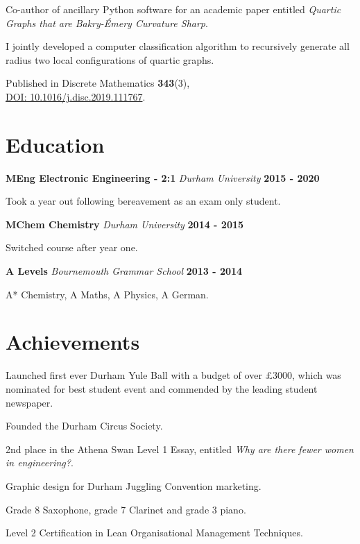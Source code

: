 \documentclass[a4paper, 11pt, hidelinks]{article}
\newcommand{\xp}[3]{
	\vspace{0.25em}
	\textbf{\large#1} \quad \emph{\large#2} \hfill \textbf{\large#3}
}
\begin{document}
\begin{minipage}{0.587\textwidth}
\begin{itemise}
			\item Co-author of ancillary Python software for an academic paper entitled \emph{Quartic Graphs that are Bakry-Émery Curvature Sharp}.
			\item I jointly developed a computer classification algorithm to recursively generate all radius two local configurations of quartic graphs.
			\item Published in Discrete Mathematics \textbf{343}(3),\\ \href{https://arxiv.org/abs/1902.10665}{DOI: 10.1016/j.disc.2019.111767}.
			\hfill
			\href{http://www.francisgurr.com/pages/summer_project/summer_project.html}{\faExternalLink}
		\end{itemise}
		
		\section{Education}
		\xp{MEng Electronic Engineering - 2:1}{Durham University}{2015 - 2020}
		\begin{itemise}
			\item Took a year out following bereavement as an exam only student.
		\end{itemise}
		\xp{MChem Chemistry}{Durham University}{2014 - 2015}
		\begin{itemise}
			\item Switched course after year one.
		\end{itemise}
		\xp{A Levels}{Bournemouth Grammar School}{2013 - 2014}
		\begin{itemise}
			\item A* Chemistry, A Maths, A Physics, A German.
		\end{itemise}
		
		\section{Achievements}
		\begin{itemise}[1em][-0.25em][0em][0em]
			\item Launched first ever Durham Yule Ball with a budget of over £3000, which was nominated for best student event and commended by the leading student newspaper.
			\hfill \href{https://www.palatinate.org.uk/things-you-need-to-do-in-durham-before-graduating/}{\faExternalLink}
			\item Founded the Durham Circus Society.
			\item 2nd place in the Athena Swan Level 1 Essay, entitled \emph{Why are there fewer women in engineering?}.
			\hfill \href{https://www.dur.ac.uk/experience/news/?itemno=27469}{\faExternalLink}
			\item Graphic design for Durham Juggling Convention marketing.
			\item Grade 8 Saxophone, grade 7 Clarinet and grade 3 piano.
			\item Level 2 Certification in Lean Organisational Management Techniques.
		\end{itemise}
	\end{minipage}
\end{document}

